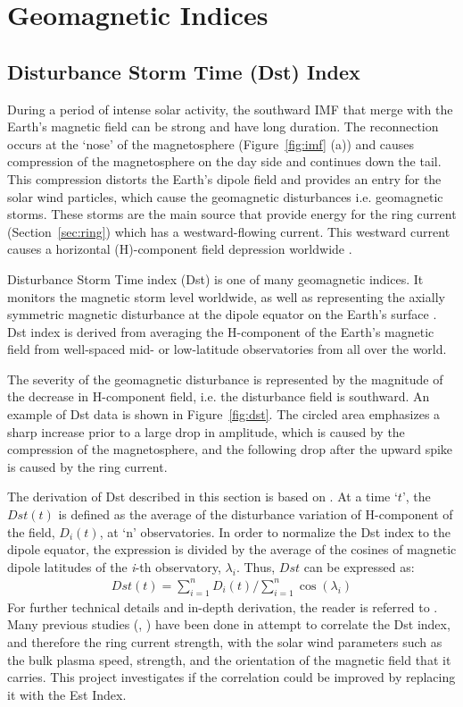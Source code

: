 \documentclass[12pt]{report} %
\begin{document}
\section{Geomagnetic Indices}
 \vspace{-5pt}
\subsection{Disturbance Storm Time (Dst) Index} \label{sec:dst}
 \vspace{-5pt}
During a period of intense solar activity, the southward IMF that merge with the Earth's magnetic field can be strong and have long duration. The reconnection occurs at the `nose' of the magnetosphere (Figure~\ref{fig:imf} (a)) and causes compression of the magnetosphere on the day side and continues down the tail. This compression distorts the Earth's dipole field and provides an entry for the solar wind particles, which cause the geomagnetic disturbances i.e. geomagnetic storms. These storms are the main source that provide energy for the ring current (Section~\ref{sec:ring}) which has a westward-flowing current. This westward current causes a horizontal (H)-component field depression worldwide \citep{campbell03}. 

Disturbance Storm Time index (Dst) is one of many geomagnetic indices. It monitors the magnetic storm level worldwide, as well as representing the axially symmetric magnetic disturbance at the dipole equator on the Earth's surface \citep{men11}. Dst index is derived from averaging the H-component of the Earth's magnetic field from well-spaced mid- or low-latitude observatories  from all over the world. 

The severity of the geomagnetic disturbance is represented by the magnitude of the decrease in H-component field, i.e. the disturbance field is southward. An example of Dst data is shown in Figure~\ref{fig:dst}. The circled area emphasizes a sharp increase prior to a large drop in amplitude, which is caused by the compression of the magnetosphere, and the following drop after the upward spike is caused by the ring current.

The derivation of Dst described in this section is based on  \cite{sugi91}. 
At a time `$t$', the $Dst(t)$ is defined as the average of the disturbance variation of H-component of the field, $D_i(t)$, at `n' observatories. In order to normalize the Dst index to the dipole equator, the expression is divided by the average of the cosines of magnetic dipole latitudes of the \textit{i}-th observatory, $\lambda_i$. Thus, $Dst$ can be expressed as: 
\begin{align}
Dst (t) =\sum_{i=1}^{n} D_i (t)  / \sum_{i=1}^{n} \cos(\lambda_i) \label{eq:1}
\end{align}
\noindent For further technical details and in-depth derivation, the reader is referred to \citep{sugi91}.
Many previous studies (\cite{russell74}, \cite{bik12}) have been done in attempt to correlate the Dst index, and therefore the ring current strength, with the solar wind parameters such as the bulk plasma speed, strength, and the orientation of the magnetic field that it carries. This project investigates if the correlation could be improved by replacing it with the Est Index. 
\end{document}
